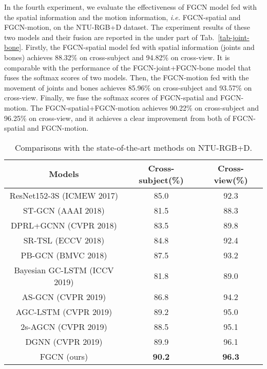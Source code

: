\documentclass[runningheads]{llncs}
\begin{document}
In the fourth experiment, we evaluate the effectiveness of FGCN model fed with the spatial information and the motion information, \textit{i.e.} FGCN-spatial and FGCN-motion, on the NTU-RGB+D dataset. The experiment results of these two models and their fusion are reported in the under part of Tab.~\ref{tab-joint-bone}. Firstly, the FGCN-spatial model fed with spatial information (joints and bones) achieves 88.32\% on cross-subject and 94.82\% on cross-view. It is comparable with the performance of the FGCN-joint+FGCN-bone model that fuses the softmax scores of two models. Then, the FGCN-motion fed with the movement of joints and bones achieves 85.96\% on cross-subject and 93.57\% on cross-view. Finally, we fuse the softmax scores of FGCN-spatial and FGCN-motion. The FGCN-spatial+FGCN-motion achieves 90.22\% on cross-subject and 96.25\% on cross-view, and it achieves a clear improvement from both of FGCN-spatial and FGCN-motion.


\begin{table}[t]
	\caption{Comparisons with the state-of-the-art methods on NTU-RGB+D.}
	\label{tab-state-rgbd}
	\tabcolsep=6pt
	\centering
	\begin{tabular}{ccc}
		\hline
		Models & Cross-subject(\%) & Cross-view(\%) \\
		\hline		
		ResNet152-3S (ICMEW 2017) \cite{li2017skeleton}	&85.0	&92.3 \\
		ST-GCN (AAAI 2018) \cite{yan2018spatial}	&81.5	&88.3 \\
		DPRL+GCNN (CVPR 2018) \cite{tang2018deep}	&83.5	&89.8 \\
		SR-TSL (ECCV 2018) \cite{si2018skeleton}	&84.8	&92.4 \\
		PB-GCN (BMVC 2018) \cite{thakkar2018part}	&87.5	&93.2 \\
		Bayesian GC-LSTM (ICCV 2019) \cite{zhao2019bayesian}	&81.8	&89.0 \\
		AS-GCN (CVPR 2019) \cite{li2019actional}	&86.8	&94.2 \\
		AGC-LSTM (CVPR 2019) \cite{si2019attention}	&89.2	&95.0 \\
		2s-AGCN (CVPR 2019) \cite{shi2019two}	&88.5	&95.1 \\
		DGNN (CVPR 2019) \cite{shi2019skeleton}	&89.9	&96.1 \\	
		\hline
		FGCN (ours)	&\textbf{90.2}	&\textbf{96.3} \\
		\hline
	\end{tabular}
\end{table}

\vspace{-1mm}
\end{document}
